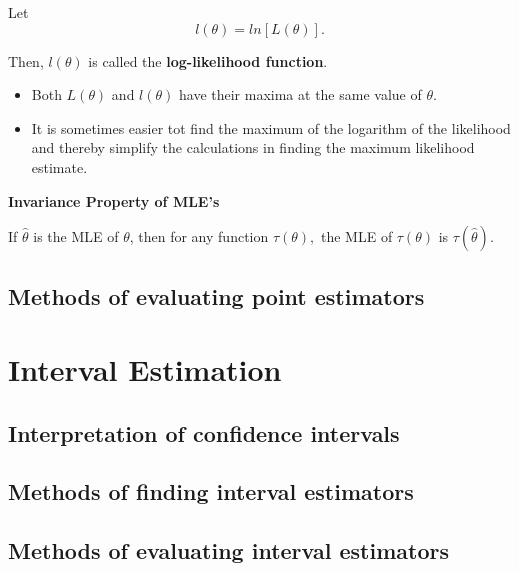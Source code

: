 \documentclass[]{book}
\providecommand{\tightlist}{%
  \setlength{\itemsep}{0pt}\setlength{\parskip}{0pt}}
\begin{document}
Let \[l(\theta) = ln[L(\theta)].\]

Then, \(l(\theta)\) is called the \textbf{log-likelihood function}.

\begin{itemize}
\tightlist
\item
  Both \(L(\theta)\) and \(l(\theta)\) have their maxima at the same value of \(\theta\).
\item
  It is sometimes easier tot find the maximum of the logarithm of the likelihood and thereby simplify the calculations in finding the maximum likelihood estimate.
\end{itemize}

\textbf{Invariance Property of MLE's}

If \(\hat{\theta}\) is the MLE of \(\theta\), then for any function \(\tau(\theta),\) the MLE of \(\tau(\theta)\) is \(\tau(\hat{\theta}).\)

\newpage

\hypertarget{methods-of-evaluating-point-estimators}{%
\subsection{Methods of evaluating point estimators}\label{methods-of-evaluating-point-estimators}}

\hypertarget{interval-estimation}{%
\section{Interval Estimation}\label{interval-estimation}}

\hypertarget{interpretation-of-confidence-intervals}{%
\subsection{Interpretation of confidence intervals}\label{interpretation-of-confidence-intervals}}

\hypertarget{methods-of-finding-interval-estimators}{%
\subsection{Methods of finding interval estimators}\label{methods-of-finding-interval-estimators}}

\hypertarget{methods-of-evaluating-interval-estimators}{%
\subsection{Methods of evaluating interval estimators}\label{methods-of-evaluating-interval-estimators}}
\end{document}
